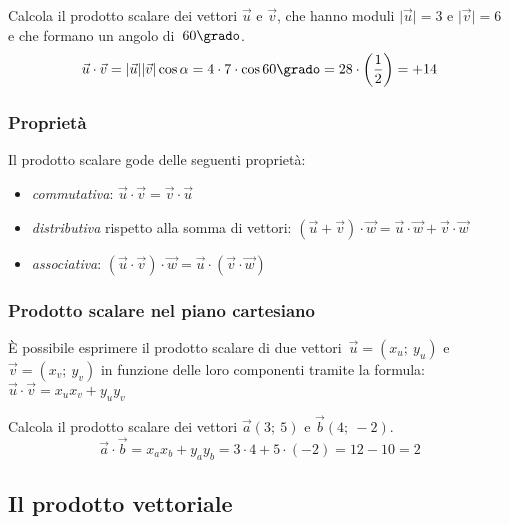  \begin{esempio}
  Calcola il prodotto scalare dei  vettori \(\vec{u}\) e \(\vec{v}\), 
  che hanno moduli \(\lvert\vec{u}\rvert= 3 \text{ e } \lvert\vec{v}\rvert=6\) 
  e che formano un angolo di~\(60\grado\).
  \[\vec{u} \cdot \vec{v} = 
    \lvert\vec{u}\rvert\lvert\vec{v}\rvert \cos \alpha=
    4 \cdot 7 \cdot \cos 60\grado = 28 \cdot \left(\frac{1}{2} \right)=
    +14\]
 \end{esempio}


\subsubsection{Proprietà}

Il prodotto scalare gode delle seguenti proprietà:
\begin{itemize} [noitemsep]
 \item \emph{commutativa}: \hfill
  \(\displaystyle\vec{u} \cdot \vec{v} = \vec{v} \cdot \vec{u}\)
 \item \emph{distributiva} rispetto alla somma di vettori: \hfill
  \(\displaystyle\left(\vec{u} + \vec{v} \right) \cdot \vec{w} = 
    \vec{u} \cdot \vec{w} + \vec{v} \cdot \vec{w}\)
 \item \emph{associativa}: \hfill
  \(\displaystyle\left(\vec{u} \cdot \vec{v} \right) \cdot \vec{w} = 
    \vec{u} \cdot \left(\vec{v} \cdot \vec{w} \right)\)
\end{itemize}

\subsubsection{Prodotto scalare nel piano cartesiano}

È possibile esprimere il prodotto scalare di due 
vettori~\(\vec{u}=(x_u;~y_u)\) e \(\vec{v}=(x_v;~y_v)\) 
in funzione delle loro componenti tramite la formula: \quad
\(\vec{u} \cdot \vec{v} = x_u x_v + y_u y_v\)

 \begin{esempio}
  Calcola il prodotto scalare dei vettori \(\vec{a}(3;~5)\) e \(\vec{b}(4;~-2)\).
\[\vec{a} \cdot \vec{b} = x_a x_b + y_a y_b = 3 \cdot 4 + 5 \cdot (-2)= 
  12-10 = 2\]
 \end{esempio}

\subsection{Il prodotto vettoriale}

